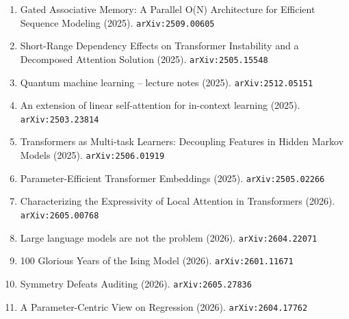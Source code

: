 \documentclass[11pt]{article}
\begin{document}
\begin{enumerate}
  \item Gated Associative Memory: A Parallel O(N) Architecture for Efficient Sequence Modeling (2025). \texttt{arXiv:2509.00605}
  \item Short-Range Dependency Effects on Transformer Instability and a Decomposed Attention Solution (2025). \texttt{arXiv:2505.15548}
  \item Quantum machine learning -- lecture notes (2025). \texttt{arXiv:2512.05151}
  \item An extension of linear self-attention for in-context learning (2025). \texttt{arXiv:2503.23814}
  \item Transformers as Multi-task Learners: Decoupling Features in Hidden Markov Models (2025). \texttt{arXiv:2506.01919}
  \item Parameter-Efficient Transformer Embeddings (2025). \texttt{arXiv:2505.02266}
  \item Characterizing the Expressivity of Local Attention in Transformers (2026). \texttt{arXiv:2605.00768}
  \item Large language models are not the problem (2026). \texttt{arXiv:2604.22071}
  \item 100 Glorious Years of the Ising Model (2026). \texttt{arXiv:2601.11671}
  \item Symmetry Defeats Auditing (2026). \texttt{arXiv:2605.27836}
  \item A Parameter-Centric View on Regression (2026). \texttt{arXiv:2604.17762}
\end{enumerate}
\end{document}
